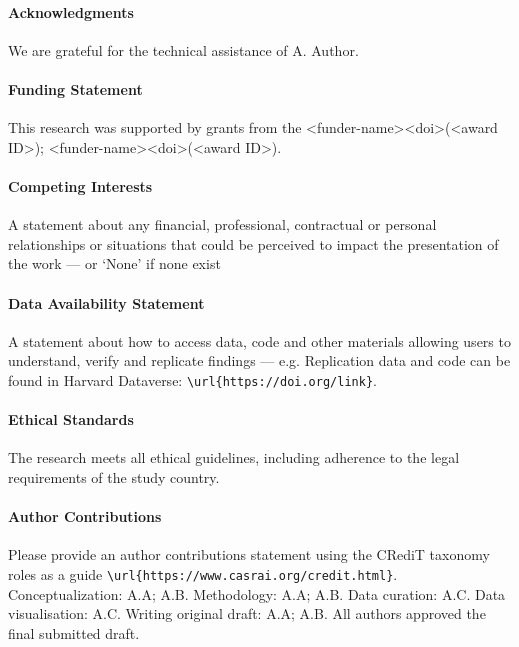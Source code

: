 \documentclass[journal=eds]{CAM-MODERN}%
\theoremstyle{definition}
\numberwithin{equation}{section}
\begin{document}
\begin{Backmatter}

\paragraph{Acknowledgments}
We are grateful for the technical assistance of A. Author.


\paragraph{Funding Statement}
This research was supported by grants from the <funder-name><doi>(<award ID>); <funder-name><doi>(<award ID>).

\paragraph{Competing Interests}
A statement about any financial, professional, contractual or personal relationships or situations that could be perceived to impact the presentation of the work --- or `None' if none exist

\paragraph{Data Availability Statement}
A statement about how to access data, code and other materials allowing users to understand, verify and replicate findings --- e.g. Replication data and code can be found in Harvard Dataverse: \verb+\url{https://doi.org/link}+.

\paragraph{Ethical Standards}
The research meets all ethical guidelines, including adherence to the legal requirements of the study country.

\paragraph{Author Contributions}
Please provide an author contributions statement using the CRediT taxonomy roles as a guide {\verb+\url{https://www.casrai.org/credit.html}+}. Conceptualization: A.A; A.B. Methodology: A.A; A.B. Data curation: A.C. Data visualisation: A.C. Writing original draft: A.A; A.B. All authors approved the final submitted draft.

\printbibliography

\end{Backmatter}
\end{document}
